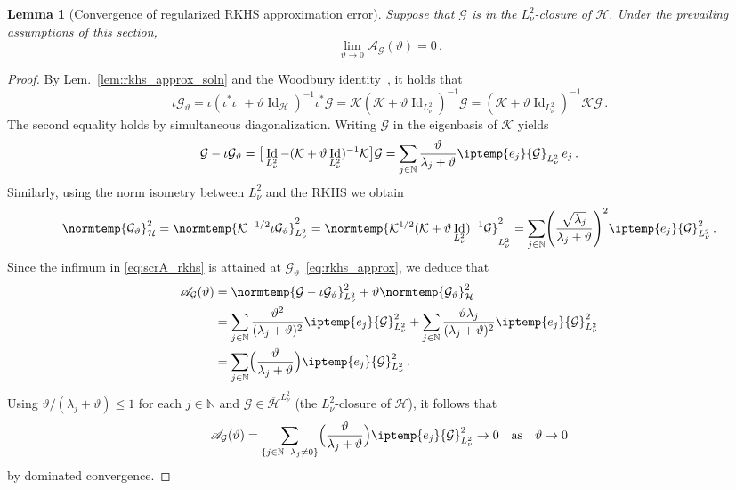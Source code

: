 \documentclass{article}
\theoremstyle{plain}
\newtheorem{lemma}[theorem]{Lemma}
\theoremstyle{my_def}
\theoremstyle{my_rem}
\numberwithin{equation}{section}
\numberwithin{theorem}{section}%
\newcommand{\N}{\mathbb{N}}
\newcommand{\scrA}{\mathscr{A}}
\newcommand{\cG}{\mathcal{G}}
\newcommand{\cH}{\mathcal{H}}
\newcommand{\cK}{\mathcal{K}}
\let\originalleft\left %
\let\originalright\right
\renewcommand{\left}{\mathopen{}\mathclose\bgroup\originalleft}
\renewcommand{\right}{\aftergroup\egroup\originalright}
\newcommand{\ip}{\iptemp}
\newcommand{\norm}{\normtemp}
\DeclareMathOperator{\Id}{Id} %
\def\qas{\quad\text{as}\quad}
\begin{document}
\begin{lemma}[Convergence of regularized RKHS approximation error]\label{lem:converge_rkhs}
    Suppose that $\cG$ is in the $L^2_\nu$-closure of $\cH$. Under the prevailing assumptions of this section,
    \begin{equation}\label{eq:scrA_to_zero}
        \lim_{\vartheta\to 0}\scrA_\cG(\vartheta)=0\,.
    \end{equation}
\end{lemma}
\begin{proof}
    By Lem.~\ref{lem:rkhs_approx_soln} and the Woodbury identity~\cite[Thm. 1]{ogawa1988operator}, it holds that
    \begin{equation*}
        \iota\cG_\vartheta = \iota(\iota^*\iota^{\phantom{*}} + \vartheta \Id_{\cH})^{-1}\iota^*\cG = \cK(\cK+\vartheta\Id_{L^2_\nu})^{-1}\cG = (\cK+\vartheta\Id_{L^2_\nu})^{-1} \cK\cG\,.
    \end{equation*}
    The second equality holds by simultaneous diagonalization. Writing $\cG$ in the eigenbasis of $\cK$ yields
    \begin{equation*}
        \cG - \iota\cG_\vartheta = \big[\Id_{L^2_\nu} - (\cK+\vartheta\Id_{L^2_\nu})^{-1} \cK\big]\cG=\sum_{j\in\N}\frac{\vartheta}{\lambda_j + \vartheta} \ip{e_j}{\cG}_{L^2_\nu}\, e_j\,. 
    \end{equation*}
    Similarly, using the norm isometry between $L^2_\nu$ and the RKHS \cite[see, e.g.,][pp. 403--404]{carmeli2006vector} we obtain
    \begin{equation*}
        \norm{\cG_\vartheta}_\cH^2
        =\norm{\cK^{-1/2}\iota \cG_\vartheta}_{L^2_\nu}^2
        =\norm{\cK^{1/2}(\cK+\vartheta\Id_{L^2_\nu})^{-1}\cG}_{L^2_\nu}^2
       =\sum_{j\in\N}\left(\frac{\sqrt{\lambda_j}}{\lambda_j+\vartheta}\right)^2\ip{e_j}{\cG}_{L^2_\nu}^2\,.
    \end{equation*}
    Since the infimum in \eqref{eq:scrA_rkhs} is attained at $\cG_\vartheta$~\eqref{eq:rkhs_approx}, we deduce that
    \begin{align*}
        \scrA_\cG(\vartheta)&=\norm{\cG - \iota \cG_\vartheta}_{L^2_\nu}^2 + \vartheta \norm{\cG_\vartheta}_{\cH}^2\\
        &=\sum_{j\in\N}\frac{\vartheta^2}{(\lambda_j + \vartheta)^2} \ip{e_j}{\cG}_{L^2_\nu}^2 + \sum_{j\in\N}\frac{\vartheta\lambda_j}{(\lambda_j + \vartheta)^2}\ip{e_j}{\cG}_{L^2_\nu}^2\\
        &=\sum_{j\in\N}\Bigl(\frac{\vartheta}{\lambda_j + \vartheta}\Bigr)\ip{e_j}{\cG}_{L^2_\nu}^2\,.
    \end{align*}
    Using $\vartheta/(\lambda_j+\vartheta)\leq 1$ for each $j\in\N$ and $\cG\in \overline{\cH}^{L^2_\nu}$ (the $L^2_\nu$-closure of $\cH$), it follows that
    \begin{equation}
        \scrA_\cG(\vartheta) = \sum_{\{j\in\N \,|\, \lambda_j\neq 0\}}\Bigl(\frac{\vartheta}{\lambda_j + \vartheta}\Bigr)\ip{e_j}{\cG}_{L^2_\nu}^2 \to 0 \qas \vartheta\to 0
    \end{equation}
    by dominated convergence.
\end{proof}
\end{document}
